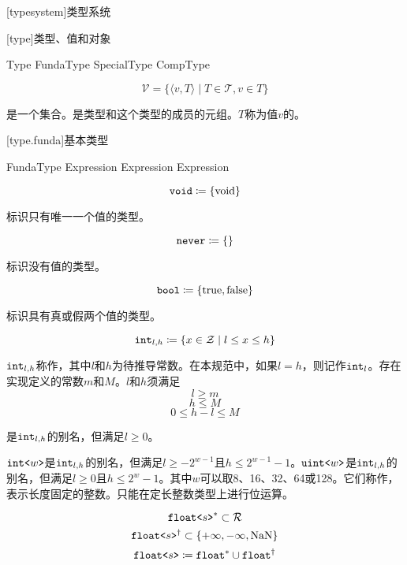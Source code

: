 
[typesystem]{类型系统}

[type]{类型、值和对象}

\begin{bnf}{Type}
    FundaType \br
    SpecialType \br
    CompType
\end{bnf}

$$ \mathcal{V} = \{ \langle v, T \rangle \mid T \in \mathcal{T}, v \in T \} $$

\pnum
{}是一个集合。是类型和这个类型的成员的元组。$T$称为值$v$的。

[type.funda]{基本类型}

\begin{bnf}{FundaType}
     \br
     \br
     \br
     \br
     \br
     \terminal{<} Expression \terminal{>} \br
     \terminal{<} Expression \terminal{>} \br
     \br
     \terminal{<} Expression \terminal{>}
\end{bnf}

$$\texttt{void} \coloneqq \{ \mathrm{void} \}$$

\pnum
{}标识只有唯一一个值的类型。

$$\texttt{never} \coloneqq \{ \}$$

\pnum
{}标识没有值的类型。

$$\texttt{bool} \coloneqq \{ \mathrm{true}, \mathrm{false} \}$$

\pnum
{}标识具有真或假两个值的类型。

$$\texttt{int}_{l,h} \coloneqq \{ x \in \mathcal{Z} \mid l \le x \le h \} $$

\pnum
$\texttt{int}_{l,h}$称作，其中$l$和$h$为待推导常数。在本规范中，如果$l = h$，则记作$\texttt{int}_l$。存在实现定义的常数$m$和$M$。$l$和$h$须满足
$$ l \ge m $$
$$ h \le M $$
$$ 0 \le h - l \le M $$

是$\texttt{int}_{l,h}$的别名，但满足$l\ge0$。

\pnum
$\texttt{int<}w\texttt{>}$是$\texttt{int}_{l,h}$的别名，但满足$l\ge-2^{w-1}$且$h\le2^{w-1}-1$。$\texttt{uint<}w\texttt{>}$是$\texttt{int}_{l,h}$的别名，但满足$l\ge0$且$h\le2^w-1$。其中$w$可以取8、16、32、64或128。它们称作，表示长度固定的整数。只能在定长整数类型上进行位运算。

$$ \texttt{float<}s\texttt{>}^\ast \subset \mathcal{R} $$
$$ \texttt{float<}s\texttt{>}^\dagger \subset \{ +\infty, -\infty, \mathrm{NaN} \} $$
$$ \texttt{float<}s\texttt{>} \coloneqq \texttt{float}^\ast \cup \texttt{float}^\dagger $$

